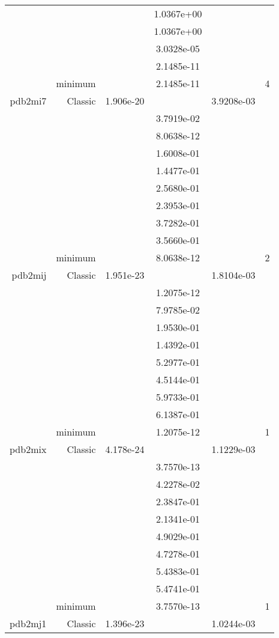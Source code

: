 \begin{xltabular}{\textwidth}{r|rS[table-format=1.3e+2]S[table-format=1.4e+2]S[table-format=1.4e+2]S[table-format=-1.5]}
&  &  & 1.0367e+00 & & \\
&  &  & 1.0367e+00 & & \\
&  &  & 3.0328e-05 & & \\
&  &  & 2.1485e-11 & & \\
& minimum &  & 2.1485e-11 & & 4 \\  \addlinespace
pdb2mi7 & Classic & 1.906e-20 &  & 3.9208e-03 & \\
&  &  & 3.7919e-02 & & \\
&  &  & 8.0638e-12 & & \\
&  &  & 1.6008e-01 & & \\
&  &  & 1.4477e-01 & & \\
&  &  & 2.5680e-01 & & \\
&  &  & 2.3953e-01 & & \\
&  &  & 3.7282e-01 & & \\
&  &  & 3.5660e-01 & & \\
& minimum &  & 8.0638e-12 & & 2 \\  \addlinespace
pdb2mij & Classic & 1.951e-23 &  & 1.8104e-03 & \\
&  &  & 1.2075e-12 & & \\
&  &  & 7.9785e-02 & & \\
&  &  & 1.9530e-01 & & \\
&  &  & 1.4392e-01 & & \\
&  &  & 5.2977e-01 & & \\
&  &  & 4.5144e-01 & & \\
&  &  & 5.9733e-01 & & \\
&  &  & 6.1387e-01 & & \\
& minimum &  & 1.2075e-12 & & 1 \\  \addlinespace
pdb2mix & Classic & 4.178e-24 &  & 1.1229e-03 & \\
&  &  & 3.7570e-13 & & \\
&  &  & 4.2278e-02 & & \\
&  &  & 2.3847e-01 & & \\
&  &  & 2.1341e-01 & & \\
&  &  & 4.9029e-01 & & \\
&  &  & 4.7278e-01 & & \\
&  &  & 5.4383e-01 & & \\
&  &  & 5.4741e-01 & & \\
& minimum &  & 3.7570e-13 & & 1 \\  \addlinespace
pdb2mj1 & Classic & 1.396e-23 &  & 1.0244e-03 & \\

\end{xltabular}
